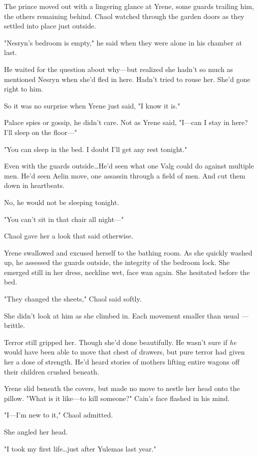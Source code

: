 The prince moved out with a lingering glance at Yrene, some guards trailing him, the others remaining behind.
Chaol watched through the garden doors as they settled into place just outside.

"Nesryn's bedroom is empty," he said when they were alone in his chamber at last.

He waited for the question about why---but realized she hadn't so much as mentioned Nesryn when she'd fled in here.
Hadn't tried to rouse her.
She'd gone right to him.

So it was no surprise when Yrene just said, "I know it is."

Palace spies or gossip, he didn't care.
Not as Yrene said, "I---can I stay in here?
I'll sleep on the floor---"

"You can sleep in the bed.
I doubt I'll get any rest tonight."

Even with the guards outside\ldots He'd seen what one Valg could do against multiple men.
He'd seen Aelin move, one assassin through a field of men.
And cut them down in heartbeats.

No, he would not be sleeping tonight.

"You can't sit in that chair all night---"

Chaol gave her a look that said otherwise.

Yrene swallowed and excused herself to the bathing room.
As she quickly washed up, he assessed the guards outside, the integrity of the bedroom lock.
She emerged still in her dress, neckline wet, face wan again.
She hesitated before the bed.

"They changed the sheets," Chaol said softly.

She didn't look at him as she climbed in.
Each movement smaller than usual ---brittle.

Terror still gripped her.
Though she'd done beautifully.
He wasn't sure if \emph{he} would have been able to move that chest of drawers, but pure terror had given her a dose of strength.
He'd heard stories of mothers lifting entire wagons off their children crushed beneath.

Yrene slid beneath the covers, but made no move to nestle her head onto the pillow.
"What is it like---to kill someone?"
Cain's face flashed in his mind.

"I---I'm new to it," Chaol admitted.

She angled her head.

"I took my first life\ldots just after Yulemas last year."

